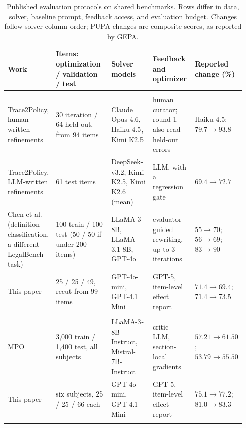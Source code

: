 \documentclass[10pt]{article} %
\begin{document}
\begin{table}[htbp]
\caption{Published evaluation protocols on shared benchmarks. Rows differ in data, solver, baseline prompt, feedback
access, and evaluation budget. Changes follow solver-column order; PUPA changes are composite scores, as reported by GEPA.}
\label{tab:prior}
\begin{center}
\footnotesize
\setlength{\tabcolsep}{3pt}
\begin{tabular}{@{}p{0.18\linewidth}p{0.24\linewidth}p{0.18\linewidth}p{0.18\linewidth}p{0.15\linewidth}@{}}
\toprule
\rowcolor{midblue}Work & Items: optimization / validation / test & Solver models & Feedback and optimizer & Reported change (\%) \\
\midrule
\rowcolor{midgreen}\multicolumn{5}{l}{\textbf{LegalBench-Hearsay}} \\
Trace2Policy, human-written refinements~\citep{zha2026trace2policy} & 30 iteration / 64 held-out, from 94 items & Claude Opus 4.6, Haiku 4.5, Kimi K2.5 & human curator; round 1 also read held-out errors & Haiku 4.5: $79.7\rightarrow 93.8$ \\
Trace2Policy, LLM-written refinements~\citep{zha2026trace2policy} & 61 test items & DeepSeek-v3.2, Kimi K2.5, Kimi K2.6 (mean) & LLM, with a regression gate & $69.4\rightarrow 72.7$ \\
Chen et al.~\citeyearpar{chen2025knowing} (definition classification, a different LegalBench task) & 100 train / 100 test (50 / 50 if under 200 items) & LLaMA-3-8B, LLaMA-3.1-8B, GPT-4o & evaluator-guided rewriting, up to 3 iterations & $55\rightarrow 70$; $56\rightarrow 69$; $83\rightarrow 90$ \\
\rowcolor{softblue}This paper & 25 / 25 / 49, recut from 99 items & GPT-4o-mini, GPT-4.1 Mini & GPT-5, item-level effect report & $71.4\rightarrow 69.4$; $71.4\rightarrow 73.5$ \\
\midrule
\rowcolor{midgreen}\multicolumn{5}{l}{\textbf{MMLU}} \\
MPO~\citep{sharma2026mpo} & 3,000 train / 1,400 test, all subjects & LLaMA-3-8B-Instruct, Mistral-7B-Instruct & critic LLM, section-local gradients & $57.21\rightarrow 61.50$; $53.79\rightarrow 55.50$ \\
\rowcolor{softblue}This paper & six subjects, 25 / 25 / 66 each & GPT-4o-mini, GPT-4.1 Mini & GPT-5, item-level effect report & $75.1\rightarrow 77.2$; $81.0\rightarrow 83.3$ \\
\midrule
\rowcolor{midgreen}\multicolumn{5}{l}{\textbf{AIME}} \\

\end{tabular}
\end{center}
\end{table}
\end{document}
